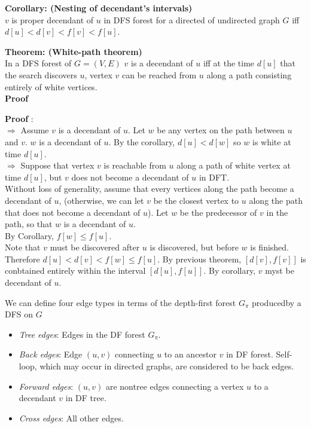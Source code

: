 \documentclass{beamer}
\begin{document}
\begin{frame}{}

{\bf Corollary: (Nesting of decendant's intervals)} \\
$v$ is proper decendant of $u$ in DFS forest for a directed
 of undirected graph $G$ iff \\
$d[u] < d[v] < f[v] < f[u]$.  
\end{frame}

\begin{frame}{}

{\bf Theorem: (White-path theorem)} \\
In a DFS forest of $G=(V,E)$ $v$ is a decendant of $u$ iff at the time
 $d[u]$ that the search discovers $u$, vertex $v$ can be reached from
 $u$ along a path consisting entirely of white vertices.  \\ 
{\bf Proof}
\end{frame}

\begin{frame}{}

{\bf Proof} : \\
$\Rightarrow$ Assume $v$ is a decendant of $u$.  Let $w$ be any
vertex on the path between $u$ and $v$.  $w$ is a decendant of $u$.  
By the corollary, $d[u]<d[w]$ so $w$ is white at time $d[u]$.  \\
$\Rightarrow$ Suppose that vertex $v$ is reachable from $u$ along a path
of white vertex at time $d[u]$, but $v$ does not become a decendant
of $u$ in DFT.  \\
Without loss of generality, assume that every vertices along the path become
a decendant of $u$, (otherwise, we can let $v$ be the closest vertex to $u$
 along the path that does not become a decendant of $u$).  
Let $w$ be the predecessor of $v$ in the path, so that $w$ is a decendant
of $u$.  \\
By Corollary, $f[w]\le f[u]$.  \\
Note that $v$ must be discovered after $u$ is discovered, but before $w$
 is finished.  Therefore $d[u]<d[v]<f[w]\le f[u]$.  By previous theorem,
$[d[v],f[v]]$ is conbtained entirely within the interval $[d[u],f[u]]$.
By corollary, $v$ myst be decendant of $u$.  
\end{frame}

\begin{frame}{}

We can define four edge types in terms of the depth-first forest $G_\pi$
 producedby a DFS on $G$
\begin{itemize}
\item {\it Tree edges}: Edges in the DF forest $G_\pi$.   
\item {\it Back edges}: Edge $(u,v)$ connecting $u$ to an ancestor $v$ in 
 DF forest.  Self-loop, which may occur in directed graphs, are
 considered to be back edges. 
\item {\it Forward edges}: $(u,v)$ are nontree edges connecting a vertex
 $u$ to a decendant $v$ in DF tree. 
\item {\it Cross edges}: All other edges.  
\end{itemize}
\end{frame}
\end{document}
